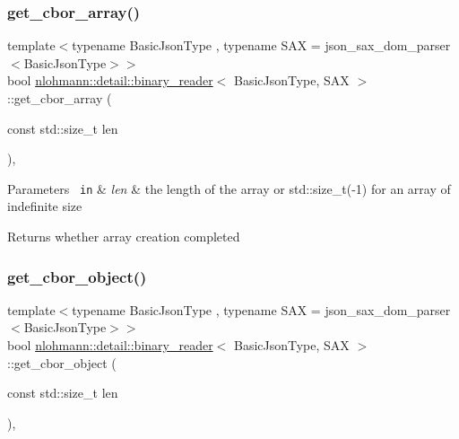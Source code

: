 \subsubsection{\texorpdfstring{get\_cbor\_array()}{get\_cbor\_array()}}
{\footnotesize\ttfamily template$<$typename Basic\+Json\+Type , typename S\+AX  = json\+\_\+sax\+\_\+dom\+\_\+parser$<$\+Basic\+Json\+Type$>$$>$ \\
bool \mbox{\hyperlink{classnlohmann_1_1detail_1_1binary__reader}{nlohmann\+::detail\+::binary\+\_\+reader}}$<$ Basic\+Json\+Type, S\+AX $>$\+::get\+\_\+cbor\+\_\+array (\begin{DoxyParamCaption}\item[{const std\+::size\+\_\+t}]{len }\end{DoxyParamCaption})\hspace{0.3cm}{\ttfamily [inline]}, {\ttfamily [private]}}


\begin{DoxyParams}[1]{Parameters}
\mbox{\texttt{ in}}  & {\em len} & the length of the array or std\+::size\+\_\+t(-\/1) for an array of indefinite size \\
\hline
\end{DoxyParams}
\begin{DoxyReturn}{Returns}
whether array creation completed 
\end{DoxyReturn}
\mbox{\label{classnlohmann_1_1detail_1_1binary__reader_a2fcc776cd2c7bb52bbc511e97d36978a}} 
\subsubsection{\texorpdfstring{get\_cbor\_object()}{get\_cbor\_object()}}
{\footnotesize\ttfamily template$<$typename Basic\+Json\+Type , typename S\+AX  = json\+\_\+sax\+\_\+dom\+\_\+parser$<$\+Basic\+Json\+Type$>$$>$ \\
bool \mbox{\hyperlink{classnlohmann_1_1detail_1_1binary__reader}{nlohmann\+::detail\+::binary\+\_\+reader}}$<$ Basic\+Json\+Type, S\+AX $>$\+::get\+\_\+cbor\+\_\+object (\begin{DoxyParamCaption}\item[{const std\+::size\+\_\+t}]{len }\end{DoxyParamCaption})\hspace{0.3cm}{\ttfamily [inline]}, {\ttfamily [private]}}


